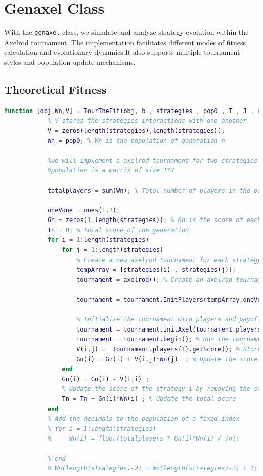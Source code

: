 \documentclass[12pt]{article}
\begin{document}
\section{Genaxel Class}
With the \texttt{genaxel} class, we simulate and analyze strategy evolution within the Axelrod tournament. The implementation facilitates different modes of
fitness calculation and evolutionary dynamics.It also supports multiple tournament styles and population update mechanisms.
\subsection{Theoretical Fitness}
\begin{lstlisting}[language=Matlab, caption = TourThefit method]
function [obj,Wn,V] = TourTheFit(obj, b , strategies , pop0 , T , J , rounding)
            % V stores the strategies interactions with one another
            V = zeros(length(strategies),length(strategies));
            Wn = pop0; % Wn is the population of generation n
           
            %we will implement a axelrod tournament for two strategies of population 1 each time 
            %population is a matrix of size 1*2 
            
            totalplayers = sum(Wn); % Total number of players in the population
  
            oneVone = ones(1,2);
            Gn = zeros(1,length(strategies)); % Gn is the score of each strategy
            Tn = 0; % Total score of the generation
            for i = 1:length(strategies)
                for j = 1:length(strategies)
                    % Create a new axelrod tournament for each strategy
                    tempArray = [strategies(i) , strategies(j)];
                    tournament = axelrod(); % Create an axelrod tournament

                    tournament = tournament.InitPlayers(tempArray,oneVone,T);

                    % Initialize the tournament with players and payoff matrix 
                    tournament = tournament.initAxel(tournament.players,b,T); 
                    tournament = tournament.begin(); % Run the tournament
                    V(i,j) =  tournament.players{1}.getScore(); % Store the score of the first player
                    Gn(i) = Gn(i) + V(i,j)*Wn(j)  ; % Update the score of the strategy i
                end
                Gn(i) = Gn(i) - V(i,i) ;
                % Update the score of the strategy i by removing the self-play score    
                Tn = Tn + Gn(i)*Wn(i) ; % Update the total score
            end
            % Add the decimals to the population of a fixed index
            % for i = 1:length(strategies)
            %     Wn(i) = floor(totalplayers * Gn(i)*Wn(i) / Tn);
               
            % end
            % Wn(length(strategies)-2) = Wn(length(strategies)-2) + 1; 
\end{lstlisting}
\end{document}

